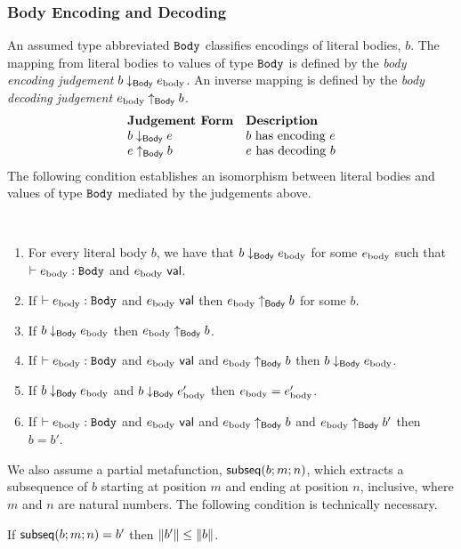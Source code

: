 \subsubsection{Body Encoding and Decoding}
An assumed type abbreviated $\mathtt{Body}$ classifies encodings of literal bodies, $b$. The mapping from literal bodies to values of type $\mathtt{Body}$ is defined by the \emph{body encoding judgement} $b \downarrow_\mathsf{Body} e_\text{body}$. An inverse mapping is defined   by the \emph{body decoding judgement} $e_\text{body} \uparrow_\mathsf{Body} b$.
\[\begin{array}{ll}
\textbf{Judgement Form} & \textbf{Description}\\
b \downarrow_\mathsf{Body} e & \text{$b$ has encoding $e$}\\
e \uparrow_\mathsf{Body} b & \text{$e$ has decoding $b$}
\end{array}\]
The following condition establishes an isomorphism between literal bodies and values of type $\mathtt{Body}$ mediated by the judgements above.
\begin{condition}\label{condition:body-isomorphism} ~
\begin{enumerate}
\item For every literal body $b$, we have that $b \downarrow_\mathsf{Body} e_\text{body}$ for some $e_\text{body}$ such that $\vdash e_\text{body} : \mathtt{Body}$ and $e_\text{body}~\mathsf{val}$.
\item If $\vdash e_\text{body} : \mathtt{Body}$ and $e_\text{body}~\mathsf{val}$ then $e_\text{body} \uparrow_\mathsf{Body} b$ for some $b$.
\item If $b \downarrow_\mathsf{Body} e_\text{body}$ then $e_\text{body} \uparrow_\mathsf{Body} b$.
\item If $\vdash e_\text{body} : \mathtt{Body}$ and $e_\text{body}~\mathsf{val}$ and $e_\text{body} \uparrow_\mathsf{Body} b$ then $b \downarrow_\mathsf{Body} e_\text{body}$. 
\item If $b \downarrow_\mathsf{Body} e_\text{body}$ and $b \downarrow_\mathsf{Body} e_\text{body}'$ then $e_\text{body} = e_\text{body}'$.
\item If $\vdash e_\text{body} : \mathtt{Body}$ and $e_\text{body}~\mathsf{val}$ and $e_\text{body} \uparrow_\mathsf{Body} b$ and $e_\text{body} \uparrow_\mathsf{Body} b'$ then $b=b'$.
\end{enumerate}
\end{condition}
We also assume a partial metafunction, $\mathsf{subseq}(b; m; n)$, which extracts a subsequence of $b$ starting at position $m$ and ending at position $n$, inclusive, where $m$ and $n$ are natural numbers. The following condition is technically necessary.
\begin{condition}\label{condition:body-subsequences} If $\mathsf{subseq}(b; m; n)=b'$ then $\Vert b' \Vert \leq \Vert b \Vert$. \end{condition}

